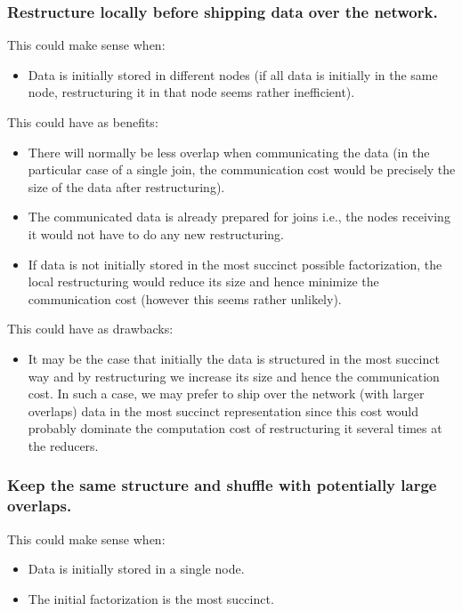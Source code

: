 \subsubsection{Restructure locally before shipping data over the network.}

This could make sense when:
\begin{itemize}
\item Data is initially stored in different nodes (if all data is initially in the same node, restructuring it in that node seems rather inefficient).
\end{itemize}

This could have as benefits:
\begin{itemize}
\item There will normally be less overlap when communicating the data (in the particular case of a single join, the communication cost would be precisely the size of the data after restructuring).

\item The communicated data is already prepared for joins i.e., the nodes receiving it would not have to do any new restructuring.

\item If data is not initially stored in the most succinct possible factorization, the local restructuring would reduce its size and hence minimize the communication cost (however this seems rather unlikely).
\end{itemize}

This could have as drawbacks:
\begin{itemize}
\item It may be the case that initially the data is structured in the most succinct way and by restructuring we increase its size and hence the communication cost.
In such a case, we may prefer to ship over the network (with larger overlaps) data in the most succinct representation since this cost would probably dominate the computation cost of restructuring it several times at the reducers.
\end{itemize}

\subsubsection{Keep the same structure and shuffle with potentially large overlaps.}

This could make sense when:
\begin{itemize}
\item Data is initially stored in a single node. 
\item The initial factorization is the most succinct.
\end{itemize}

